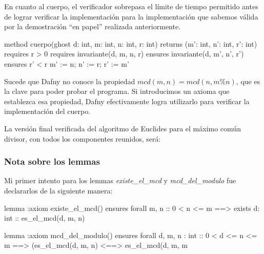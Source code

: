 \documentclass[12pt, a4paper, openany, fleqn]{book}
\begin{document}
    En cuanto al cuerpo, el verificador sobrepasa el límite de tiempo permitido antes de lograr verificar la implementación  para la implementación que sabemos válida por la demostración ``en papel'' realizada anteriormente.

    \begin{dafny}
method cuerpo(ghost d: int, m: int, n: int, r: int)
    returns (m': int, n': int, r': int)
    requires r > 0
    requires invariante(d, m, n, r)
    ensures invariante(d, m', n', r')
    ensures r' < r
{
    m' := n;
    n' := r;
    r' := m' %
}
    \end{dafny}

    Sucede que Dafny no conoce la propiedad $mcd(m, n) = mcd(n, m\%n)$, que es la clave para poder probar el programa. Si introducimos un axioma que establezca esa propiedad, Dafny efectivamente logra utilizarlo para verificar la implementación del cuerpo.


    La versión final verificada del algoritmo de Euclides para el máximo común divisor, con todos los componentes reunidos, será:


    \subsubsection*{Nota sobre los lemmas}
    Mi primer intento para los lemmas \textit{existe\_el\_mcd} y \textit{mcd\_del\_modulo} fue declararlos de la siguiente manera:

    \begin{dafny}
lemma {:axiom} existe_el_mcd()
    ensures forall m, n :: 0 < n <= m ==> exists d: int :: es_el_mcd(d, m, n)

lemma {:axiom} mcd_del_modulo()
    ensures forall d, m, n : int :: 0 < d <= n <= m ==> (es_el_mcd(d, m, n) <==> es_el_mcd(d, m, m %
    \end{dafny}
\end{document}
